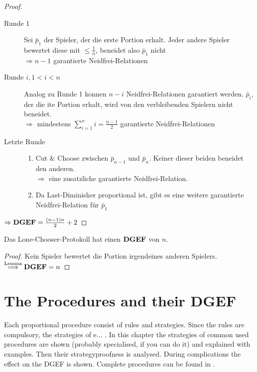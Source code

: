 \begin{proof}
 \begin{description}
  \item[Runde 1] Sei $\bar{p}_1$ der Spieler, der die erste Portion erhalt. Jeder andere Spieler bewertet diese mit $\leq\frac{1}{n}$,
                 beneidet also $\bar{p}_1$ nicht\\$\Rightarrow n-1$ garantierte Neidfrei-Relationen
  \item[Runde $i, 1<i<n$] Analog zu Runde 1 konnen $n-i$ Neidfrei-Relationen garantiert werden. $\bar{p}_i$, der die ite Portion erhalt, wird
                          von den verbleibenden Spielern nicht beneidet.\\$\Rightarrow$ mindestens $\sum\limits_{i=1}^ni=\frac{n-1}{2}$
                          garantierte Neidfrei-Relationen
  \item[Letzte Runde] \begin{enumerate}
                       \item Cut \& Choose zwischen $\bar{p}_{n-1}$ und $\bar{p}_n$. Keiner dieser beiden beneidet den anderen.\\
                             $\Rightarrow$ eine zusatzliche garantierte Neidfrei-Relation.
                       \item Da Last-Diminisher proportional ist, gibt es eine weitere garantierte Neidfrei-Relation für $\bar{p}_1$
                      \end{enumerate}
 \end{description}
$\Rightarrow\text{\textbf{DGEF}}=\frac{(n-1)n}{2}+2$ 
\end{proof}
\begin{satz}
 Das Lone-Chooser-Protokoll hat einen $\text{\textbf{DGEF}}$ von $n$.
\end{satz}
\begin{proof}
 Kein Spieler bewertet die Portion irgendeines anderen Spielers.\\$\stackrel{\text{Lemma}}{\Longrightarrow}\text{\textbf{DGEF}}=n$
\end{proof}


\pagebreak

\section{The Procedures and their DGEF}
Each proportional procedure consist of rules and strategies. Since the rules are compulsory, the strategies of e... . In this chapter the strategies of common used procedures are shown (probably specialised, if you can do it) and explained with examples. Then their strategyproofness is analysed. During complications the effect on the DGEF is shown. Complete procedures can be found in \cite{}.
